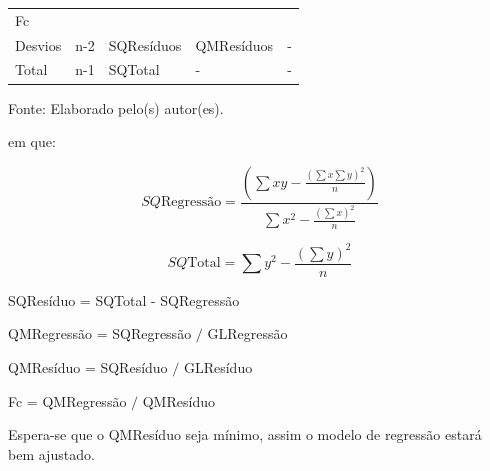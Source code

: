 \documentclass[12pt,brazil,oneside]{book}
\begin{document}
\begin{longtable}[]{@{}lllll@{}}
\begin{minipage}[t]{0.08\columnwidth}
Fc\strut
\end{minipage}\tabularnewline
\begin{minipage}[t]{0.19\columnwidth}\raggedright
Desvios\strut
\end{minipage} & \begin{minipage}[t]{0.10\columnwidth}\raggedright
n-2\strut
\end{minipage} & \begin{minipage}[t]{0.16\columnwidth}\raggedright
SQResíduos\strut
\end{minipage} & \begin{minipage}[t]{0.17\columnwidth}\raggedright
QMResíduos\strut
\end{minipage} & \begin{minipage}[t]{0.08\columnwidth}\raggedright
-\strut
\end{minipage}\tabularnewline
\begin{minipage}[t]{0.19\columnwidth}\raggedright
Total\strut
\end{minipage} & \begin{minipage}[t]{0.10\columnwidth}\raggedright
n-1\strut
\end{minipage} & \begin{minipage}[t]{0.16\columnwidth}\raggedright
SQTotal\strut
\end{minipage} & \begin{minipage}[t]{0.17\columnwidth}\raggedright
-\strut
\end{minipage} & \begin{minipage}[t]{0.08\columnwidth}\raggedright
-\strut
\end{minipage}\tabularnewline
\bottomrule
\end{longtable}

Fonte: Elaborado pelo(s) autor(es).

em que:

\[
SQ \textrm{Regressão} = \frac{(\sum xy - \frac{(\sum x \sum y)^2}{n})}{\sum x^2 - \frac{(\sum x)^2}{n}}
\]

\[
SQ \textrm{Total} = \sum y^2 - \frac{(\sum y)^2}{n}
\]

SQResíduo = SQTotal - SQRegressão

QMRegressão = SQRegressão \(/\) GLRegressão

QMResíduo = SQResíduo \(/\) GLResíduo

Fc = QMRegressão \(/\) QMResíduo

Espera-se que o QMResíduo seja mínimo, assim o modelo de regressão estará
bem ajustado.
\end{document}
